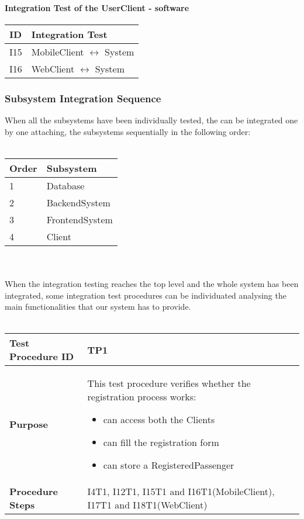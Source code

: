 		\paragraph{Integration Test of the UserClient - software}
		\begin{tabular}{p{2cm} | p{10cm}} \hline
			\textbf{ID} & \textbf{Integration Test} \\ \hline
			I15 & MobileClient $\leftrightarrow$ System \\ \hline
			I16 & WebClient $\leftrightarrow$ System \\ \hline
		\end{tabular}
		\subsubsection{Subsystem Integration Sequence}
			When all the subsystems have been individually tested, the can be integrated one by one
			attaching, the subsystems sequentially in the following order:
			\\ \\
			\begin{tabular}{p{2cm} | p{10cm}} \hline
				\textbf{Order} & \textbf{Subsystem} \\ \hline
				1 & Database \\ \hline
				2 & BackendSystem \\ \hline
				3 & FrontendSystem \\ \hline
				4 & Client \\ \hline
			\end{tabular}
			\\ \\
			When the integration testing reaches the top level and the whole system has been integrated,
			some integration test procedures can be individuated analysing the main functionalities that
			our system has to provide.
			\\ \\
			\begin{tabular}{p{4cm} | p{8cm}} \hline
				\textbf{Test Procedure ID} & TP1 \\ \hline
				\textbf{Purpose} & This test procedure verifies whether the registration process works:
				\begin{itemize}
					\item can access both the Clients
					\item can fill the registration form
					\item can store a RegisteredPassenger
				\end{itemize}
				\\ \hline
				\textbf{Procedure Steps} & I4T1, I12T1, I15T1 and I16T1(MobileClient), I17T1 and I18T1(WebClient) \\ \hline
			\end{tabular}
